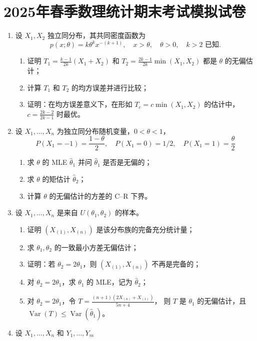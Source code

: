 \section{2025年春季数理统计期末考试模拟试卷}
\begin{enumerate}
\item 设 $X_{1}, X_{2}$ 独立同分布，其共同密度函数为
$$p(x;\theta)=k \theta^{k} x^{-(k+1)}, 
\quad x>\theta, \quad \theta>0, \quad k>2 \text { 已知.}$$
\begin{enumerate}[label=(\arabic*)]
\item 证明 $T_{1}=\frac{k-1}{2k}(X_{1}+X_{2})$ 和 $T_{2}=\frac{2k-1}{2k} \min (X_{1}, X_{2})$ 都是 $\theta$ 的无偏估计；
\item 计算 $T_{1}$ 和 $T_{2}$ 的均方误差并进行比较；
\item 证明：在均方误差意义下，在形如 $T_{c}=c \min (X_{1}, X_{2})$ 的估计中，$c=\frac{2k-2}{2k-1}$ 时最优。
\end{enumerate}
\item 设 $X_{1}, \ldots, X_{n}$ 为独立同分布随机变量，$0<\theta<1$，
$$P(X_{1}=-1)=\frac{1-\theta}{2}, \quad P(X_{1}=0)=1/2, 
\quad P(X_{1}=1)=\frac{\theta}{2}$$
\begin{enumerate}[label=(\arabic*)]
\item 求 $\theta$ 的 MLE $\hat{\theta}_{1}$ 并问 $\hat{\theta}_{1}$ 是否是无偏的；
\item 求 $\theta$ 的矩估计 $\hat{\theta}_{2}$；
\item 计算 $\theta$ 的无偏估计的方差的 C--R 下界。
\end{enumerate}
\item 设 $X_{1}, \ldots, X_{n}$ 是来自 $U(\theta_{1}, \theta_{2})$ 的样本。
\begin{enumerate}[label=(\arabic*)]
\item 证明 $(X_{(1)}, X_{(n)})$ 是该分布族的完备充分统计量；
\item 求 $\theta_{1}, \theta_{2}$ 的一致最小方差无偏估计；
\item 证明：若 $\theta_{2}=2 \theta_{1}$，则 $(X_{(1)}, X_{(n)})$ 不再是完备的；
\item 对 $\theta_{2}=2 \theta_{1}$，求 $\theta_{1}$ 的 MLE，记为 $\hat{\theta}_{2}$；
\item 对 $\theta_{2}=2 \theta_{1}$，令 $T=\frac{(n+1)(2X_{(n)}+X_{(1)})}{5n+4}$，
则 $T$ 是 $\theta_{1}$ 的无偏估计，且 $\operatorname{Var}(T) \leq \operatorname{Var}(\hat{\theta}_{1})$。
\end{enumerate}
\item 设 $X_{1}, \ldots, X_{n}$ 和 $Y_{1}, \ldots, Y_{m}$ 

\end{enumerate}
